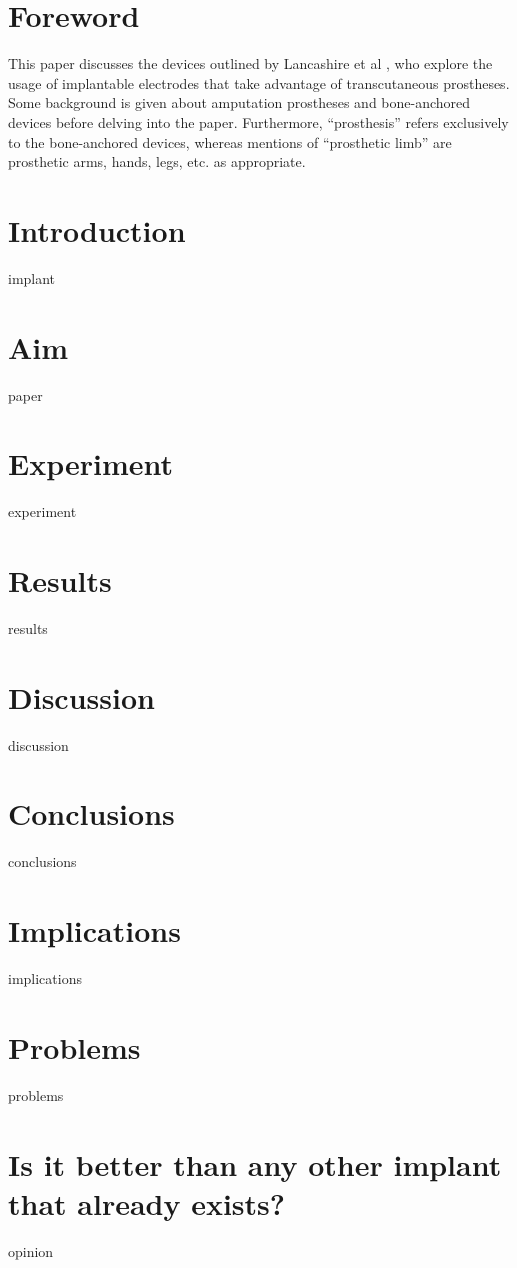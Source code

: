 \documentclass[oneside]{article}
\begin{document}

	\tableofcontents
	\clearpage
{}
\section{Foreword}
This paper discusses the devices outlined by Lancashire et al \cite{LancashireHenryT2019HERf}, who explore the usage of implantable electrodes that take advantage of transcutaneous prostheses. Some background is given about amputation prostheses and bone-anchored devices before delving into the paper.
Furthermore, ``prosthesis'' refers exclusively to the bone-anchored devices, whereas mentions of ``prosthetic limb'' are prosthetic arms, hands, legs, etc. as appropriate.
\section{Introduction}
	{implant}
\section{Aim}
	{paper}
\section{Experiment}
	{experiment}
\section{Results}
	{results}
\section{Discussion}
	{discussion}
\section{Conclusions}
	{conclusions}
\section{Implications}
	{implications}
\section{Problems}
	{problems}
\section{Is it better than any other implant that already exists?}
	{opinion}

\clearpage
	
	
\end{document}
